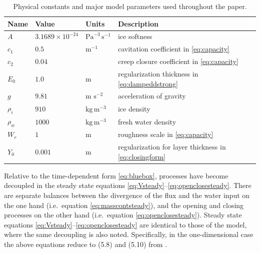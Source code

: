\documentclass[11pt,final]{amsart}%
\begin{document}
\begin{table}[ht]
  \centering
  \caption{Physical constants and major model parameters used throughout the paper.}
  \begin{tabular}{lllp{3.0in}} 
    \textbf{Name} & \textbf{Value} & \textbf{Units} & \textbf{Description}\\
\hline
    $A$ & $3.1689\times 10^{-24}$ & $\text{Pa}^{-3}\,\text{s}^{-1}$ & ice softness \citep{EISMINT96} \phantom{$\Big|$} \\
    $c_1$ & $0.5$ & $\text{m}^{-1}$ & cavitation coefficient in \eqref{eq:capacity} \\
    $c_2$ & $0.04$ & & creep closure coefficient in \eqref{eq:capacity} \\
    $E_0$ & $1.0$ & m & regularization thickness in \eqref{eq:dampeddstrong} \\
    $g$ & $9.81$ & m $\text{s}^{-2}$ & acceleration of gravity \\
    $\rho_i$ & $910$ & $\text{kg}\,\text{m}^{-3}$ & ice density \citep{GreveBlatter2009} \\
    $\rho_w$ & $1000$ & $\text{kg}\,\text{m}^{-3}$ & fresh water density \citep{GreveBlatter2009} \\
    $W_r$ & $1$ & $\text{m}$ & roughness scale in \eqref{eq:capacity} \\
    $Y_0$ & $0.001$ & m & regularization for layer thickness in \eqref{eq:closingform} \\
    \hline
  \end{tabular}
 \label{tab:constants}
\end{table}

Relative to the time-dependent form \eqref{eq:bluebox}, processes have become decoupled in the steady state equations \eqref{eq:Vsteady}--\eqref{eq:openclosesteady}.  There are separate balances between the divergence of the flux and the water input on the one hand (i.e.~equation \eqref{eq:masscontsteady}), and the opening and closing processes on the other hand (i.e.~equation \eqref{eq:openclosesteady}).  Steady state equations \eqref{eq:Vsteady}--\eqref{eq:openclosesteady} are identical to those of the \cite{Schoofetal2012} model, where the same decoupling is also noted.  Specifically, in the one-dimensional case the above equations reduce to (5.8) and (5.10) from \cite{Schoofetal2012}.
\end{document}
